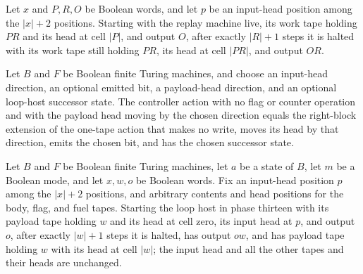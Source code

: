 \begin{lemma}
\label{Turing.FinTM.loopReplay_run}
\leanok
{}
Let $x$ and $P,R,O$ be Boolean words, and let $p$ be an input-head position among the
$|x|+2$ positions. Starting with the replay machine live, its work tape holding $PR$ and
its head at cell $|P|$, and output $O$, after exactly $|R|+1$ steps it is halted with
its work tape still holding $PR$, its head at cell $|PR|$, and output $OR$.
\end{lemma}

\begin{lemma}
\label{Turing.FinTM.loopControl_payload}
\leanok
{}
Let $B$ and $F$ be Boolean finite Turing machines, and choose an input-head direction,
an optional emitted bit, a payload-head direction, and an optional loop-host successor
state. The controller action with no flag or counter operation and with the payload head
moving by the chosen direction equals the right-block extension of the one-tape action
that makes no write, moves its head by that direction, emits the chosen bit, and has the
chosen successor state.
\end{lemma}

\begin{lemma}
\label{Turing.FinTM.loopHost_replay}
\leanok
{}
Let $B$ and $F$ be Boolean finite Turing machines, let $a$ be a state of $B$, let $m$ be
a Boolean mode, and let $x,w,o$ be Boolean words. Fix an input-head position $p$ among
the $|x|+2$ positions, and arbitrary contents and head positions for the body, flag, and
fuel tapes. Starting the loop host in phase thirteen with its payload tape holding $w$
and its head at cell zero, its input head at $p$, and output $o$, after exactly $|w|+1$
steps it is halted, has output $o w$, and has payload tape holding $w$ with its head at
cell $|w|$; the input head and all the other tapes and their heads are unchanged.
\end{lemma}

